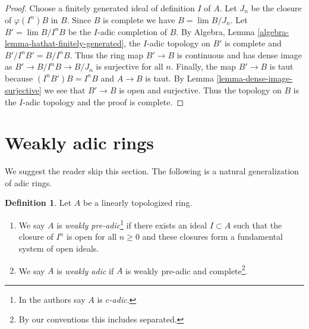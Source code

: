 \documentclass{stacks-project}
\newenvironment{reference}{\comment}{\endcomment}
\theoremstyle{plain}
\theoremstyle{definition}
\newtheorem{definition}[subsection]{Definition}
\theoremstyle{remark}
\numberwithin{equation}{subsection}
\def\lim{\mathop{\mathrm{lim}}\nolimits}
\begin{document}
\begin{proof}
Choose a finitely generated ideal of definition $I$ of $A$.
Let $J_n$ be the closure of $\varphi(I^n)B$ in $B$.
Since $B$ is complete we have $B = \lim B/J_n$.
Let $B' = \lim B/I^nB$ be the $I$-adic completion of $B$.
By Algebra, Lemma \ref{algebra-lemma-hathat-finitely-generated},
the $I$-adic topology on $B'$ is complete and
$B'/I^nB' = B/I^nB$. Thus the ring map $B' \to B$ is continuous
and has dense image as $B' \to B/I^nB \to B/J_n$ is surjective
for all $n$. Finally, the map $B' \to B$ is taut
because $(I^nB')B = I^nB$ and $A \to B$ is taut.
By Lemma \ref{lemma-dense-image-surjective} we see that $B' \to B$ is open
and surjective. Thus the topology on $B$ is the $I$-adic topology
and the proof is complete.
\end{proof}








\section{Weakly adic rings}
\label{section-weakly-adic}

\noindent
We suggest the reader skip this section. The following is a natural
generalization of adic rings.

\begin{definition}
\label{definition-weakly-adic}
\begin{reference}
\cite[Definition 8.3.8]{Gabber-Ramero}
\end{reference}
Let $A$ be a linearly topologized ring.
\begin{enumerate}
\item We say $A$ is {\it weakly pre-adic}\footnote{In \cite{Gabber-Ramero} the
authors say $A$ is {\it $c$-adic}.} if there exists an ideal
$I \subset A$ such that the closure of $I^n$ is open for all $n \geq 0$
and these closures form a fundamental system of open ideals.
\item We say $A$ is {\it weakly adic} if $A$ is weakly pre-adic
and complete\footnote{By our conventions this includes separated.}.
\end{enumerate}
\end{definition}
\end{document}

